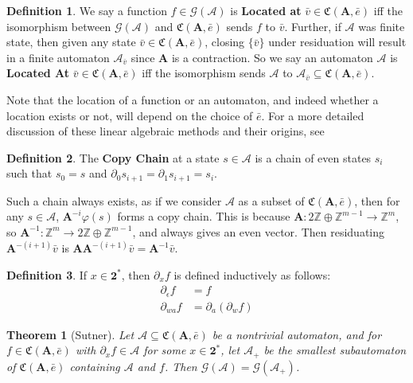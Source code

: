 \documentclass{article}
\newcommand{\A}{\mathcal{A}}
\newcommand{\G}{\mathcal{G}}
\newcommand{\C}{\mathfrak{C}(\Am,\e)}
\newcommand{\Z}{\mathbb{Z}}
\newcommand{\2}{\textbf{2}}
\newcommand{\Am}{\textbf{A}}
\newcommand{\del}{\partial}
\newcommand{\vv}{\bar{v}}
\newcommand{\e}{\bar{e}}
\newtheorem{thm}{Theorem}
\theoremstyle{definition}
\newtheorem{defn}{Definition}
\begin{document}
\begin{defn}
  We say a function $f \in \G(\A)$ is \textbf{Located at} $\vv \in \C$ iff 
  the isomorphism between $\G(\A)$ and $\C$ sends $f$ to $\vv$. Further, if
  $\A$ was finite state, then given any state $\vv \in \C$, closing 
  $\{ \vv \}$ under residuation will result in a finite automaton 
  $\A_{\vv}$ since $\Am$ is a contraction. So we say an automaton $\A$ is 
  \textbf{Located At} $\vv \in \C$ iff the isomorphism sends $\A$ to 
  $\A_{\vv} \subseteq \C$. 
\end{defn}

Note that the location of a function or an automaton, and indeed whether a 
location exists or not, will depend on the choice of $\e$. For a more detailed
discussion of these linear algebraic methods and their origins, see
\cite{Nekrashevych05:self_similar_groups,NekrashevychSidki04:automorphisms}

\begin{defn}
  The \textbf{Copy Chain} at a state $s \in \A$ is a chain of even states
  $s_i$ such that $s_0 = s$ and $\del_0 s_{i+1} = \del_1 s_{i+1} = s_i$.
\end{defn}

Such a chain always exists, as if we consider $\A$ as a subset of $\C$,
then for any $s \in \A$, $\Am^{-i} \varphi(s)$ forms a copy chain.
This is because $\Am : 2 \Z \oplus \Z^{m-1} \to \Z^m$, so 
$\Am^{-1} : \Z^m \to 2 \Z \oplus \Z^{m-1}$, and always gives an even vector.
Then residuating $\Am^{-(i+1)}\vv$ is $\Am \Am^{-(i+1)}\vv = \Am^{-1}\vv$.

\begin{defn}
  If $x \in \2^*$, then $\del_x f$ is defined inductively as follows:
  \begin{align*}
    \del_\epsilon f &= f\\
    \del_{wa} f     &= \del_a (\del_w f)
  \end{align*}
\end{defn}

\begin{thm}[Sutner]
  Let $\A \subseteq \C$ be a nontrivial automaton, and for $f \in \C$ with
  $\del_x f \in \A$ for some $x \in \2^*$, let $\A_+$ be the smallest
  subautomaton of $\C$ containing $\A$ and $f$. Then $\G(\A) = \G(\A_+)$.
\end{thm}
\end{document}
